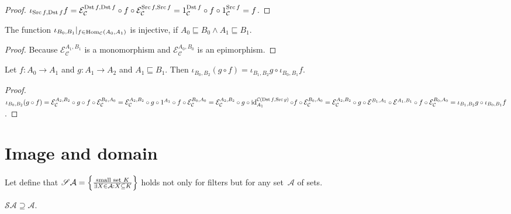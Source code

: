 \begin{proof}
  $\iota_{\operatorname{Src} f, \operatorname{Dst} f} f = \mathcal{E}_\mathcal{C}^{\operatorname{Dst} f,\operatorname{Dst} f} \circ f \circ \mathcal{E}_\mathcal{C}^{\operatorname{Src} f,\operatorname{Src} f} =
  1_{\mathcal{C}}^{\operatorname{Dst} f} \circ f \circ 1_{\mathcal{C}}^{\operatorname{Src} f} = f$.
\end{proof}

\begin{prop}
  The function $\iota_{B_0, B_1} |_{f \in \operatorname{Hom}_{\mathcal{C}} (A_0 ,
  A_1)}$ is injective, if $A_0 \sqsubseteq B_0 \wedge A_1 \sqsubseteq B_1$.
\end{prop}

\begin{proof}
  Because $\mathcal{E}_{\mathcal{C}}^{A_1,B_1}$ is a monomorphism and $\mathcal{E}_{\mathcal{C}}^{A_0,B_0}$ is an epimorphism.
\end{proof}

\begin{prop}\label{iota-comp}
  Let $f : A_0 \rightarrow A_1$ and $g : A_1 \rightarrow A_2$ and $A_1
  \sqsubseteq B_1$. Then $\iota_{B_0, B_2} (g \circ f) = \iota_{B_1, B_2} g
  \circ \iota_{B_0, B_1} f$.
\end{prop}

\begin{proof}
  $\iota_{B_0, B_2} (g \circ f) = \mathcal{E}_{\mathcal{C}}^{A_2,B_2}
  \circ g \circ f \circ \mathcal{E}_{\mathcal{C}}^{B_0,A_0} = \mathcal{E}_{\mathcal{C}}^{A_2,B_2} \circ g \circ 1^{A_1} \circ f
  \circ \mathcal{E}_{\mathcal{C}}^{B_0,A_0} = \mathcal{E}_{\mathcal{C}}^{A_2,B_2} \circ g \circ \operatorname{id}^{\mathcal{C}(\operatorname{Dst} f,\operatorname{Src} g)}_{A_1} \circ f
  \circ \mathcal{E}_{\mathcal{C}}^{B_0,A_0} = \mathcal{E}_{\mathcal{C}}^{A_2,B_2} \circ g \circ \mathcal{E}^{B_1,A_1}
  \circ \mathcal{E}^{A_1,B_1} \circ f \circ \mathcal{E}_{\mathcal{C}}^{B_0,A_0} = \iota_{B_1, B_2} g \circ \iota_{B_0,
  B_1} f$.
\end{proof}

\section{Image and domain}

Let define that
$\mathscr{S}\mathcal{A}=\left\{ \frac{\text{small set }K}{
\exists X\in\mathcal{A}:X\subseteq K}\right\}$
holds not only for filters but for any set~$\mathcal{A}$ of
sets.

\begin{obvious}
$\mathscr{S}\mathcal{A}\supseteq\mathcal{A}$.
\end{obvious}

